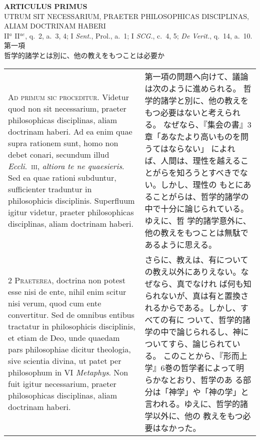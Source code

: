 \documentclass[10pt]{jsarticle}
\begin{document}
\newpage

\begin{center}
 {\Large {\bf ARTICULUS PRIMUS}}\\
 {\large UTRUM SIT NECESSARIUM, PRAETER PHILOSOPHICAS
 DISCIPLINAS,\\ALIAM DOCTRINAM HABERI}\\
 {\footnotesize II$^a$ II$^{ae}$, q.~2, a.~3, 4; I {\itshape Sent.},
 Prol., a.~1; I {\itshape SCG.}, c.~4, 5; {\itshape De Verit.}, q.~14, a.~10.}\\
 {\Large 第一項\\哲学的諸学とは別に、他の教えをもつことは必要か}
\end{center}

\begin{longtable}{p{21em}p{21em}}
{\huge A}{\scshape d primum sic proceditur}. Videtur quod non sit
necessarium, praeter philosophicas disciplinas, aliam doctrinam
haberi. Ad ea enim quae supra rationem sunt, homo non debet conari,
secundum illud {\itshape Eccli}.~{\scshape iii}, {\itshape altiora te ne
quaesieris}. Sed ea quae rationi subduntur, sufficienter traduntur in
philosophicis disciplinis. Superfluum igitur videtur, praeter
philosophicas disciplinas, aliam doctrinam haberi.

&

第一項の問題へ向けて、議論は次のように進められる。
哲学的諸学と別に、他の教えをもつ必要はないと考えられる。
なぜなら、『集会の書』3章「あなたより高いものを問うてはならない」 によれ
 ば、人間は、理性を越えることがらを知ろうとすべきでない。しかし、理性の
 もとにあることがらは、哲学的諸学の中で十分に論じられている。ゆえに、哲
 学的諸学意外に、他の教えをもつことは無駄であるように思える。

\\

{\scshape 2 Praeterea}, doctrina non potest esse nisi de ente, nihil
enim scitur nisi verum, quod cum ente convertitur. Sed de omnibus
entibus tractatur in philosophicis disciplinis, et etiam de Deo, unde
quaedam pars philosophiae dicitur theologia, sive scientia divina, ut
patet per philosophum in VI {\itshape Metaphys}. Non fuit igitur
necessarium, praeter philosophicas disciplinas, aliam doctrinam haberi.


&


さらに、教えは、有についての教え以外にありえない。なぜなら、真でなけれ
ば何も知られないが、真は有と置換されるからである。しかし、すべての有に
ついて、哲学的諸学の中で論じられるし、神についてすら、論じられている。
このことから、『形而上学』6巻の哲学者によって明らかなとおり、哲学のあ
る部分は「神学」や「神の学」と言われる。ゆえに、哲学的諸学以外に、他の
教えをもつ必要はなかった。



\end{longtable}
\end{document}
